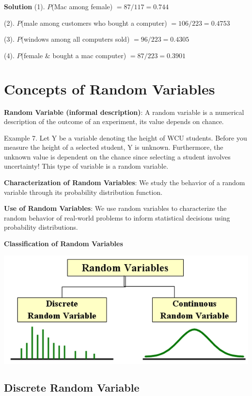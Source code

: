 \documentclass[
]{book}
\begin{document}
\textbf{Solution} (1). \(P\)(Mac among female) \(= 87/117 = 0.744\)

(2). \(P\)(male among customers who bought a computer) \(= 106/223 = 0.4753\)

(3). \(P\)(windows among all computers sold) \(= 96/223 = 0.4305\)

(4). \(P\)(female \& bought a mac computer) \(= 87/223 = 0.3901\)

\hypertarget{concepts-of-random-variables}{%
\section{Concepts of Random Variables}\label{concepts-of-random-variables}}

\textbf{Random Variable (informal description)}: A random variable is a numerical description of the outcome of an experiment, its value depends on chance.

Example 7. Let Y be a variable denoting the height of WCU students. Before you measure the height of a selected student, Y is unknown. Furthermore, the unknown value is dependent on the chance since selecting a student involves uncertainty! This type of variable is a random variable.

\textbf{Characterization of Random Variables}: We study the behavior of a random variable through its probability distribution function.

\textbf{Use of Random Variables}: We use random variables to characterize the random behavior of real-world problems to inform statistical decisions using probability distributions.

\textbf{Classification of Random Variables}

\begin{center}\includegraphics[width=0.5\linewidth]{week03/classificationRV} \end{center}

\hypertarget{discrete-random-variable}{%
\subsection{Discrete Random Variable}\label{discrete-random-variable}}
\end{document}
